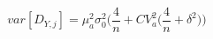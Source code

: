 \begin{equation}
var[D_{Y,j}] =\mu_a^2\sigma_0^2\Big(\frac{4}{n} + CV_{a}^2\Big(\frac{4}{n} + \delta^2\Big)\Big)
\end{equation}